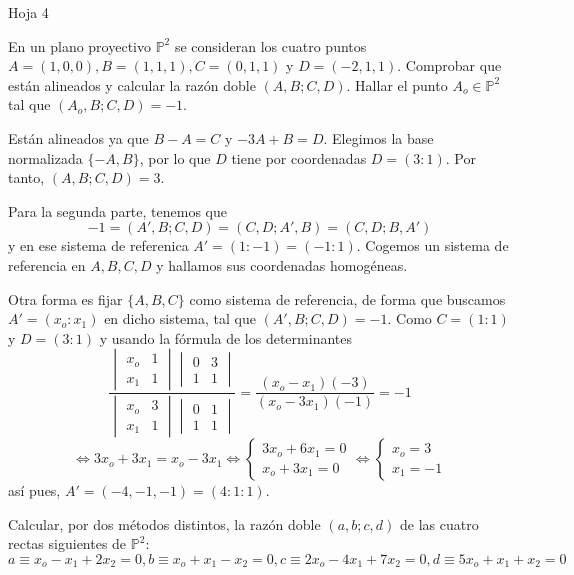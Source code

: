 Hoja 4
\begin{ejer}
    [11] En un plano proyectivo $\mathbb P^2$ se consideran los cuatro puntos $A = (1, 0, 0), B = (1, 1, 1), C = (0, 1, 1)$ y $D = (-2, 1, 1)$. Comprobar que est\'an alineados y calcular la raz\'on doble $(A, B; C, D)$. Hallar el punto $A_o \in \mathbb P^2$ tal que $(A_o , B; C, D) = -1$.
\end{ejer}
\begin{sol}
    Est\'an alineados ya que $B-A=C$ y $-3A+B=D$. Elegimos la base normalizada $\{-A, B\}$, por lo que $D$ tiene por coordenadas $D=(3:1)$. Por tanto, $(A,B;C,D)=3$. 

    Para la segunda parte, tenemos que 
    $$-1=(A',B;C,D)=(C,D;A',B) = (C,D;B,A') $$
    y en ese sistema de referenica $A'=(1:-1) = (-1:1)$. Cogemos un sistema de referencia en $A,B,C,D$ y hallamos sus coordenadas homog\'eneas. 

    Otra forma es fijar $\{A,B,C\}$ como sistema de referencia, de forma que buscamos $A'=(x_o:x_1)$ en dicho sistema, tal que $(A' , B; C, D) = -1$. Como $C=(1:1)$ y $D = (3:1)$ y usando la f\'ormula de los determinantes
    $$\dfrac{\begin{vmatrix}
        x_o & 1 \\ x_1 & 1
    \end{vmatrix}\begin{vmatrix}
        0 & 3 \\ 1 & 1
    \end{vmatrix}}{\begin{vmatrix}
        x_o & 3 \\ x_1 & 1
    \end{vmatrix}\begin{vmatrix}
        0 & 1 \\ 1 & 1
    \end{vmatrix}} = \dfrac{(x_o-x_1) (-3)}{(x_o-3x_1)(-1)} = -1 $$ 
    $$\iff 3x_o+3x_1=x_o-3x_1 \iff \begin{cases}
        3x_o+6x_1 = 0\\x_o+3x_1=0
    \end{cases} \iff \begin{cases}
        x_o = 3 \\ x_1 =-1
    \end{cases}$$
    as\'i pues, $A'=(-4,-1,-1) = (4:1:1)$.
\end{sol}
\begin{ejer}
    [13] Calcular, por dos m\'etodos distintos, la raz\'on doble $(a, b; c, d)$ de las cuatro rectas siguientes de $\mathbb P^2$:
$$a \equiv x_o - x_1 + 2x_2 = 0, b \equiv x_o + x_1 - x_2 = 0, c \equiv 2x_o - 4x_1 + 7x_2 = 0, d \equiv 5x_o + x_1 + x_2 = 0$$
\end{ejer}
